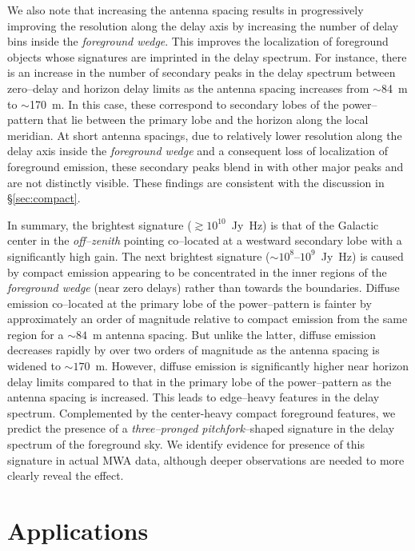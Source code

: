 \documentclass[preprint2,iop,numberedappendix]{emulateapj}
\begin{document}
We also note that increasing the antenna spacing results in progressively improving the resolution along the delay axis by increasing the number of delay bins inside the {\it foreground wedge}. This improves the localization of foreground objects whose signatures are imprinted in the delay spectrum. For instance, there is an increase in the number of secondary peaks in the delay spectrum between zero--delay and horizon delay limits as the antenna spacing increases from $\sim$84~m to $\sim$170~m. In this case, these correspond to secondary lobes of the power--pattern that lie between the primary lobe and the horizon along the local meridian. At short antenna spacings, due to relatively lower resolution along the delay axis inside the {\it foreground wedge} and a consequent loss of localization of foreground emission, these secondary peaks blend in with other major peaks and are not distinctly visible. These findings are consistent with the discussion in \S\ref{sec:compact}.

In summary, the brightest signature ($\gtrsim 10^{10}$~Jy~Hz) is that of the Galactic center in the {\it off--zenith} pointing co--located at a westward secondary lobe with a significantly high gain. The next brightest signature ($\sim 10^8$--$10^9$~Jy~Hz) is caused by compact emission appearing to be concentrated in the inner regions of the {\it foreground wedge} (near zero delays) rather than towards the boundaries. Diffuse emission co--located at the primary lobe of the power--pattern is fainter by approximately an order of magnitude relative to compact emission from the same region for a $\sim 84$~m antenna spacing. But unlike the latter, diffuse emission decreases rapidly by over two orders of magnitude as the antenna spacing is widened to $\sim 170$~m. However, diffuse emission is significantly higher near horizon delay limits compared to that in the primary lobe of the power--pattern as the antenna spacing is increased. This leads to edge--heavy features in the delay spectrum. Complemented by the center-heavy compact foreground features, we predict the presence of a {\it three--pronged pitchfork}--shaped signature in the delay spectrum of the foreground sky. We identify evidence for presence of this signature in actual MWA data, although deeper observations are needed to more clearly reveal the effect.

\section{Applications}\label{sec:fg-grading}
\end{document}
